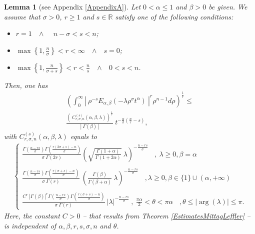 \documentclass{amsart}
\newtheorem{lemma}[theorem]{Lemma}
\theoremstyle{definition}
\theoremstyle{remark}
\numberwithin{equation}{section}
\begin{document}
\begin{lemma}[see Appendix \ref{AppendixA}]\label{LrMittagLeffler}  	Let $0<\alpha\leq 1$ and $\beta>0$ be given. We assume that $\sigma>0$, $r\geq 1$ and $\displaystyle s\in \mathbb{R}$ satisfy one of the following conditions:
	\begin{itemize}
		\item[{\bf (i)}] $r=1$~~$\wedge$~~ $n-\sigma<s<n$;
		\item[{\bf (ii)}] $\displaystyle \max\left\{1,\frac{n}{\sigma}\right\} <r<\infty$~~$\wedge$~~$s=0$;  
		\item[{\bf (iii)}] $\displaystyle \max\left\{1,\frac{n}{\sigma+s}\right\} <r<\frac{n}{s}$~~$\wedge$~~$0<s<n$. 
	\end{itemize}	Then, one has	\begin{eqnarray}
		\label{IneqC}
		\displaystyle  \left(\int_0^\infty\left|~ \rho^{-s}E_{\alpha,\beta}(-\lambda \rho^\sigma t^{\alpha})~\right|^r \rho^{n-1}d\rho\right)^{\frac{1}{r}}
		\leq  \nonumber \\ \frac{\left(~C_{r,\sigma,n}^{(s)}(\alpha,\beta,\lambda) \right)^{\frac{1}{r}}}{\left|~\Gamma(\beta)~\right|}~t^{-\frac{\alpha}{\sigma}\left(\frac{n}{r}-s\right)},
	\end{eqnarray}
	with $C_{r,\sigma,n}^{(s)}(\alpha,\beta,\lambda)$ equals to
	\begin{eqnarray*}
		\begin{cases} \displaystyle \frac{\Gamma\left(\frac{ n-rs}{\sigma}\right)\Gamma\left(\frac{r(2\sigma+s)-n}{\sigma}\right)}{\sigma~\Gamma(2r)}\left(\sqrt{\frac{\Gamma(1+\alpha)}{\Gamma(1+2\alpha)}}~\lambda  \right)^{-\frac{n-rs}{\sigma}} \displaystyle~~~~,~\lambda\geq 0,\beta=\alpha
			\\ \ \\
			\displaystyle \frac{\Gamma\left(\frac{ n-rs}{\sigma}\right)\Gamma\left(\frac{r(\sigma+s)-n}{\sigma}\right)}{\sigma~\Gamma(r)}~\left(\frac{\Gamma(\beta)}{\Gamma(\beta+\alpha)}~\lambda \right)^{-\frac{n-rs}{\sigma}} ~~~~,\lambda\geq 0,\beta\in \{1\}\cup (\alpha,+\infty) \\ \ \\
			\displaystyle \frac{C^r~|\Gamma(\beta)|^r\Gamma\left(\frac{ n-rs}{\sigma}\right)\Gamma\left(\frac{r(\sigma+s)-n}{\sigma}\right)}{\sigma~\Gamma(r)}~|\lambda|^{-\frac{n-rs}{\sigma}}~,~\frac{\pi\alpha}{2}<\theta<\pi \alpha~~~~,\theta\leq |\arg(\lambda)|\leq \pi.
		\end{cases}
	\end{eqnarray*}
	Here, the constant $C>0$ -- that results from Theorem \ref{EstimatesMittagLeffler} -- is independent of $\alpha,\beta,r,s,\sigma,n$ and $\theta$.
\end{lemma}
\end{document}
